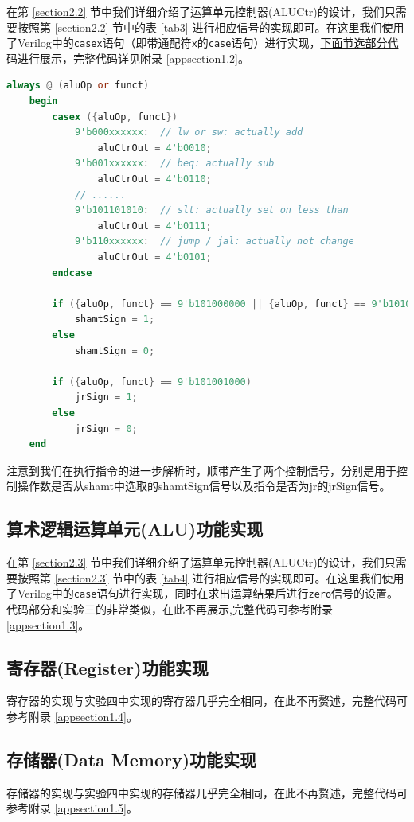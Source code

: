 \documentclass{cumcm}
\numberwithin{equation}{section}
\numberwithin{equation}{subsection}
\begin{document}
在第 \ref{section2.2} 节中我们详细介绍了运算单元控制器(ALUCtr)的设计，我们只需要按照第 \ref{section2.2} 节中的表 \ref{tab3} 进行相应信号的实现即可。在这里我们使用了Verilog中的\texttt{casex}语句（即带通配符\texttt{x}的\texttt{case}语句）进行实现，\underline{下面节选部分代码进行展示}，完整代码详见附录 \ref{appsection1.2}。

\begin{lstlisting}[language=verilog]
always @ (aluOp or funct)
    begin
        casex ({aluOp, funct})
            9'b000xxxxxx:  // lw or sw: actually add
                aluCtrOut = 4'b0010;
            9'b001xxxxxx:  // beq: actually sub
                aluCtrOut = 4'b0110;
            // ...... 
            9'b101101010:  // slt: actually set on less than
                aluCtrOut = 4'b0111;
            9'b110xxxxxx:  // jump / jal: actually not change
                aluCtrOut = 4'b0101;
        endcase        
        
        if ({aluOp, funct} == 9'b101000000 || {aluOp, funct} == 9'b101000010)
            shamtSign = 1;
        else 
            shamtSign = 0;
        
        if ({aluOp, funct} == 9'b101001000)
            jrSign = 1;
        else 
            jrSign = 0;
    end
\end{lstlisting}

注意到我们在执行指令的进一步解析时，顺带产生了两个控制信号，分别是用于控制操作数是否从shamt中选取的shamtSign信号以及指令是否为jr的jrSign信号。

\subsection{算术逻辑运算单元(ALU)功能实现}\label{section3.3}

在第 \ref{section2.3} 节中我们详细介绍了运算单元控制器(ALUCtr)的设计，我们只需要按照第 \ref{section2.3} 节中的表 \ref{tab4} 进行相应信号的实现即可。在这里我们使用了Verilog中的\texttt{case}语句进行实现，同时在求出运算结果后进行\texttt{zero}信号的设置。代码部分和实验三的非常类似，在此不再展示,完整代码可参考附录 \ref{appsection1.3}。

\subsection{寄存器(Register)功能实现}\label{section3.4}
寄存器的实现与实验四中实现的寄存器几乎完全相同，在此不再赘述，完整代码可参考附录 \ref{appsection1.4}。

\subsection{存储器(Data Memory)功能实现}\label{section3.5}
存储器的实现与实验四中实现的存储器几乎完全相同，在此不再赘述，完整代码可参考附录 \ref{appsection1.5}。
\end{document}

